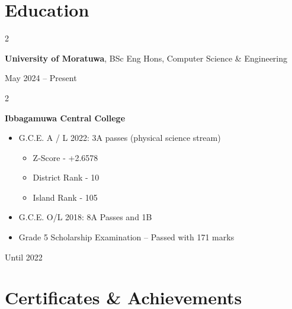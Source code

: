 \documentclass[10pt, letterpaper]{article}
\newenvironment{highlights}{
    \begin{itemize}[
        topsep=0.10 cm,
        parsep=0.10 cm,
        partopsep=0pt,
        itemsep=0pt,
        leftmargin=0.4 cm + 10pt
    ]
}{
    \end{itemize}
} %
\newenvironment{twocolentry}[2][]{
    \onecolentry
    \def\secondColumn{#2}
    \setcolumnwidth{\fill, 4.5 cm}
    \begin{paracol}{2}
}{
    \switchcolumn \raggedleft \secondColumn
    \end{paracol}
    \endonecolentry
} %
\begin{document}
          \section{Education}



        
        \begin{twocolentry}{
            May 2024 – Present
        }
            \textbf{University of Moratuwa}, BSc Eng Hons, Computer Science \& Engineering

            
         
        \end{twocolentry}



   \vspace{0.2 cm}
        \begin{twocolentry}{
            Until 2022
        }
            \textbf{Ibbagamuwa Central College }

    \begin{highlights}
                
    \item G.C.E. A / L 2022: 3A passes (physical science stream)  \begin{itemize}
        \item Z-Score - +2.6578
        \item District Rank - 10
        \item Island Rank - 105
    \end{itemize}
    
       \item G.C.E. O/L 2018: 8A Passes and 1B
     \item Grade 5 Scholarship Examination – Passed with 171 marks
    \end{highlights} 
    \end{twocolentry}
    
    \section{ Certificates \& Achievements }
   
\end{document}
